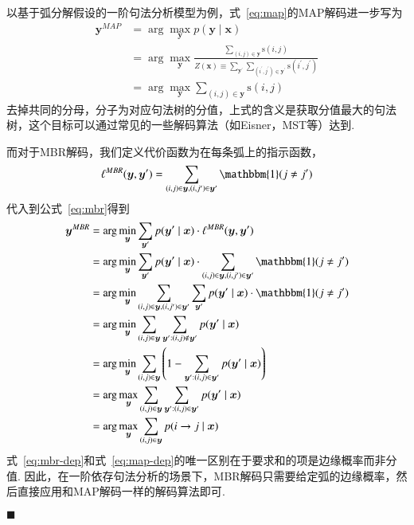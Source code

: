 以基于弧分解假设的一阶句法分析模型为例，式~\ref{eq:map}的MAP解码进一步写为
\begin{equation}
  \label{eq:map-dep}
  \begin{split}
    \boldsymbol{y}^{MAP}&=\arg\max_{\boldsymbol{y}}p(\boldsymbol{y}\mid\boldsymbol{x})\\
    &=\arg\max_{\boldsymbol{y}}\frac{\sum_{(i,j)\in \boldsymbol{y}}\mathrm{s}(i,j)}{Z(\boldsymbol{x})\equiv \sum_{\boldsymbol{y}^{\prime}}\sum_{(i^{\prime},j^{\prime})\in \boldsymbol{y}^{\prime}}\mathrm{s}(i^{\prime},j^{\prime})}\\
    &=\arg\max_{\boldsymbol{y}}\sum_{(i,j)\in \boldsymbol{y}}\mathrm{s}(i,j)
  \end{split}
\end{equation}
去掉共同的分母，分子为对应句法树的分值，上式的含义是获取分值最大的句法树，这个目标可以通过常见的一些解码算法（如Eisner，MST等）达到.

而对于MBR解码，我们定义代价函数为在每条弧上的指示函数，
\begin{equation}
  \ell^{MBR}(\boldsymbol{y},\boldsymbol{y}^{\prime}) = \sum_{(i,j)\in\boldsymbol{y},(i,j^{\prime})\in\boldsymbol{y}^{\prime}}\mathbbm{1}(j\neq j^{\prime})
\end{equation}
代入到公式~\ref{eq:mbr}得到
\begin{equation}
  \label{eq:mbr-dep}
  \begin{split}
    \boldsymbol{y}^{MBR}&= \arg\min_{\boldsymbol{y}}\sum_{\boldsymbol{y}^{\prime}}p(\boldsymbol{y}^{\prime}\mid\boldsymbol{x})\cdot\ell^{MBR}(\boldsymbol{y},\boldsymbol{y}^{\prime})\\
    &=\arg\min_{\boldsymbol{y}}\sum_{\boldsymbol{y}^{\prime}}p(\boldsymbol{y}^{\prime}\mid\boldsymbol{x})\cdot\sum_{(i,j)\in\boldsymbol{y},(i,j^{\prime})\in\boldsymbol{y}^{\prime}}\mathbbm{1}(j\neq j^{\prime})\\
    &=\arg\min_{\boldsymbol{y}}\sum_{(i,j)\in\boldsymbol{y},(i,j^{\prime})\in\boldsymbol{y}^{\prime}}\sum_{\boldsymbol{y}^{\prime}}p(\boldsymbol{y}^{\prime}\mid\boldsymbol{x})\cdot\mathbbm{1}(j\neq j^{\prime})\\
    &=\arg\min_{\boldsymbol{y}}\sum_{(i,j)\in\boldsymbol{y}}\sum_{\boldsymbol{y}^{\prime}:(i,j)\notin \boldsymbol{y}^{\prime}}p(\boldsymbol{y}^{\prime}\mid\boldsymbol{x})\\
    &=\arg\min_{\boldsymbol{y}}\sum_{(i,j)\in\boldsymbol{y}}\left(1-\sum_{\boldsymbol{y}^{\prime}:(i,j)\in \boldsymbol{y}^{\prime}}p(\boldsymbol{y}^{\prime}\mid\boldsymbol{x})\right)\\
    &=\arg\max_{\boldsymbol{y}}\sum_{(i,j)\in\boldsymbol{y}}\sum_{\boldsymbol{y}^{\prime}:(i,j)\in \boldsymbol{y}^{\prime}}p(\boldsymbol{y}^{\prime}\mid\boldsymbol{x})\\
    &=\arg\max_{\boldsymbol{y}}\sum_{(i,j)\in\boldsymbol{y}}p(i\rightarrow j\mid\boldsymbol{x})
  \end{split}
\end{equation}
式~\ref{eq:mbr-dep}和式~\ref{eq:map-dep}的唯一区别在于要求和的项是边缘概率而非分值.
因此，在一阶依存句法分析的场景下，MBR解码只需要给定弧的边缘概率，然后直接应用和MAP解码一样的解码算法即可\citep{smith-smith-2007-probabilistic, smith-2011-linguistic}.

\noindent$\blacksquare$

